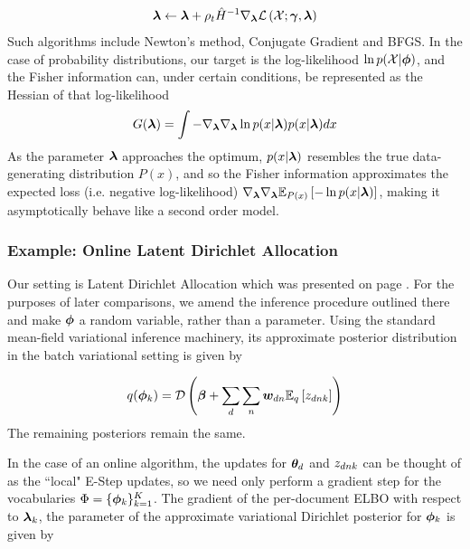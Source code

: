 \begin{align}
\varparam \leftarrow \varparam + \rho_t \inv{\hat{H}}\nabla_\varparam \elbo
\end{align}
Such algorithms include Newton's method, Conjugate Gradient and BFGS. In the case of probability distributions, our target is the log-likelihood $\ln p(\xdat|\param)$, and the Fisher information can, under certain conditions, be represented as the Hessian of that log-likelihood
\begin{align}
G(\varparam) = \int -\nabla_\varparam \nabla_\varparam \ln p(x|\varparam) p(x|\varparam) dx
\end{align}
As the parameter $\varparam$ approaches the optimum, $p(x|\varparam)$ resembles the true data-generating distribution $P(x)$, and so the Fisher information approximates the expected loss (i.e. negative log-likelihood)  $\nabla_\varparam\nabla_\varparam\ex{-\ln p(x|\varparam)}{P(x)}$, making it asymptotically behave like a second order model.


\subsubsection*{Example: Online Latent Dirichlet Allocation}

Our setting is Latent Dirichlet Allocation which was presented on page \pageref{sec:chap1:lda}. For the purposes of later comparisons, we amend the inference procedure outlined there and make $\param$ a random variable, rather than a parameter. Using the standard mean-field variational inference machinery, its approximate posterior distribution in the batch variational setting is given by

\begin{align}
q(\param_k) = \dir{\vv{\beta} + \sum_d \sum_n \vv{w}_{dn} \ex{\zdnk}{q}}
\end{align}
The remaining posteriors remain the same. 

In the case of an online algorithm, the updates for $\thd$ and $\zdnk$ can be thought of as the ``local" E-Step updates, so we need only perform a gradient step for the vocabularies $\Phi = \{ \param_k \}_{k=1}^K$. The gradient of the per-document ELBO with respect to $\varparam_k$, the parameter of the approximate variational Dirichlet posterior for $\param_k$ is given by

